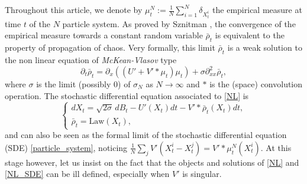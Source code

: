 \documentclass[JEP,XML,SOM,Unicode,published]{cedram}
\theoremstyle{plain}
\theoremstyle{definition}
\begin{document}
Throughout this article, we denote by $\mu^N_t:=\frac{1}{N}\sum_{i=1}^N\delta_{X^i_t}$ the empirical measure at time $t$ of the $N$ particle system. As proved by Sznitman \cite{Saint_Flour_1991}, the convergence of the empirical measure towards a constant random variable $\bar{\rho}_t$ is equivalent to the property of propagation of chaos. Very formally, this limit $\bar{\rho}_t$ is a weak solution to the non linear equation of \textit{McKean-Vlasov} type
\begin{equation}\label{NL}
\partial_t \bar{\rho}_t=\partial_x\left(\left(U'+V'\ast\mu_t\right)\mu_t\right)+\sigma \partial^2_{xx}\bar{\rho}_t,
\end{equation}
where $\sigma$ is the limit (possibly $0$) of $\sigma_N$ as $N\to\infty$ and $\ast$ is the (space) convolution operation. The stochastic differential equation associated to \eqref{NL} is
\begin{equation}\label{NL_SDE}
\begin{cases}
dX_t=\sqrt{2\sigma}\,dB_t-U'(X_t)dt-V'\ast\bar{\rho}_t(X_t)dt,\\
\bar{\rho}_t=\text{Law}(X_t),
\end{cases}
\end{equation}
and can also be seen as the formal limit of the stochastic differential equation (SDE) \eqref{particle_system}, noticing $\frac{1}{N}\sum_{j}V'(X^i_t-X^j_t)=V'\ast\mu^N_t(X^i_t).$ At this stage however, let us insist on the fact that the objects and solutions of \eqref{NL} and \eqref{NL_SDE} can be ill defined, especially when $V'$ is singular.
\end{document}
